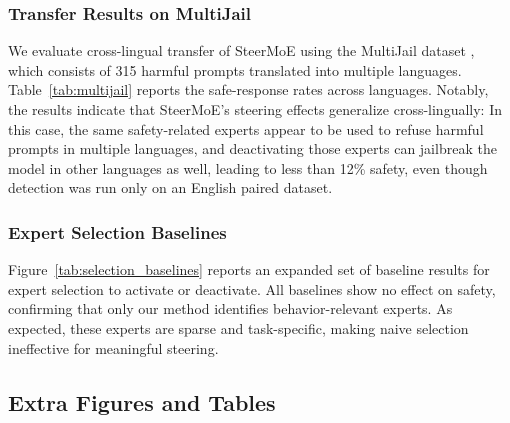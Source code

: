 \documentclass{article} %
\begin{document}
\subsubsection{Transfer Results on MultiJail}

We evaluate cross-lingual transfer of SteerMoE using the MultiJail dataset \citep{deng2023multilingual}, which consists of 315 harmful prompts translated into multiple languages. Table~\ref{tab:multijail} reports the safe-response rates across languages. Notably, the results indicate that SteerMoE’s steering effects generalize cross-lingually: In this case, the same safety-related experts appear to be used to refuse harmful prompts in multiple languages, and deactivating those experts can jailbreak the model in other languages as well, leading to less than 12\% safety, even though detection was run only on an English paired dataset.

\subsubsection{Expert Selection Baselines}

Figure~\ref{tab:selection_baselines} reports an expanded set of baseline results for expert selection to activate or deactivate. All baselines show no effect on safety, confirming that only our method identifies behavior-relevant experts. As expected, these experts are sparse and task-specific, making naive selection ineffective for meaningful steering.


\subsection{Extra Figures and Tables}


% 




% 








\end{document}
